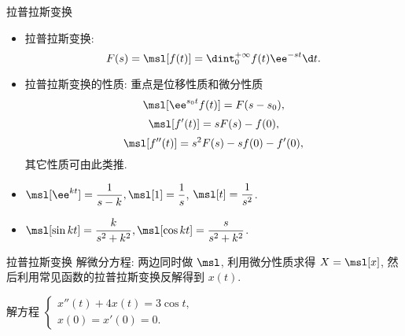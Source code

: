 \documentclass[aspectratio=169,handout]{ctexbeamer}
\begin{document}
\begin{frame}{拉普拉斯变换}
	\begin{itemize}
		\item 拉普拉斯变换:
	\[
			F(s)=\msl[f(t)]=\dint_0^{+\infty}f(t)\ee^{-st}\d t.
	\]
		\item 拉普拉斯变换的性质: 重点是位移性质和微分性质
	\[
		\msl[\ee^{s_0t}f(t)]=F(s-s_0),
	\]
	\[
		\msl[f'(t)]=sF(s)-f(0),
	\]
	\[
		\msl[f''(t)]=s^2F(s)-sf(0)-f'(0),
	\]
		其它性质可由此类推.
		\item $\msl[\ee^{kt}]=\dfrac1{s-k},\msl[1]=\dfrac1s$,
		$\msl[t]=\dfrac1{s^2}$.
		\item $\msl[\sin{kt}]=\dfrac k{s^2+k^2},\msl[\cos{kt}]=\dfrac s{s^2+k^2}$.
	\end{itemize}
\end{frame}


\begin{frame}{拉普拉斯变换}
	\onslide<+->
	解微分方程: 两边同时做 $\msl$, 利用微分性质求得 $X=\msl[x]$, 然后利用常见函数的拉普拉斯变换反解得到 $x(t)$.
	\onslide<+->
	\begin{exercise}
		解方程 
		$\begin{cases}
			x''(t)+4x(t)=3\cos t,& \\
			x(0)=x'(0)=0.&
		\end{cases}$
	\end{exercise}
\end{frame}
\end{document}
